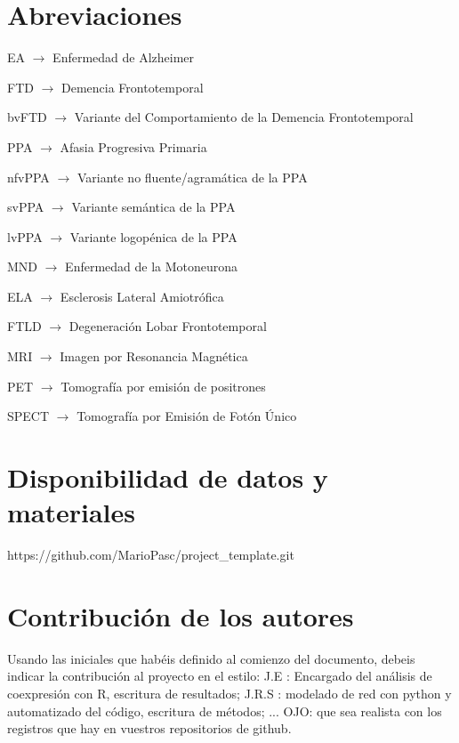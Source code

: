 \documentclass{bmcart}
\begin{document}
	\begin{backmatter}
	
		\section*{Abreviaciones}%
			EA $\rightarrow$ Enfermedad de Alzheimer
		
			FTD $\rightarrow$ Demencia Frontotemporal
			
			bvFTD $\rightarrow$ Variante del Comportamiento de la Demencia Frontotemporal
			
			PPA $\rightarrow$ Afasia Progresiva Primaria
			
			nfvPPA $\rightarrow$ Variante no fluente/agramática de la PPA
			
			svPPA $\rightarrow$ Variante semántica de la PPA
			
			lvPPA $\rightarrow$ Variante logopénica de la PPA
			
			MND $\rightarrow$ Enfermedad de la Motoneurona
			
			ELA $\rightarrow$ Esclerosis Lateral Amiotrófica
			
			FTLD $\rightarrow$ Degeneración Lobar Frontotemporal
			
			MRI $\rightarrow$ Imagen por Resonancia Magnética
			
			PET $\rightarrow$ Tomografía por emisión de positrones
			
			SPECT $\rightarrow$ Tomografía por Emisión de Fotón Único
			
		
		\section*{Disponibilidad de datos y materiales}%
			https://github.com/MarioPasc/project\_template.git
		
		\section*{Contribución de los autores}
			Usando las iniciales que habéis definido al comienzo del documento, debeis indicar la contribución al proyecto en el estilo:
			J.E : Encargado del análisis de coexpresión con R, escritura de resultados; J.R.S : modelado de red con python y automatizado del código, escritura de métodos; ...
			OJO: que sea realista con los registros que hay en vuestros repositorios de github. 
		
		
		
	
	\end{backmatter}
\end{document}
